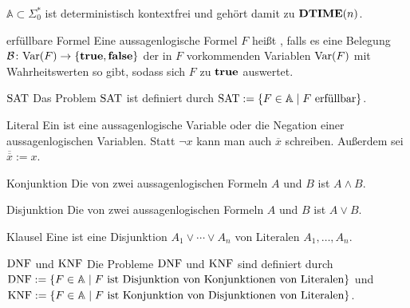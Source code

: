 \begin{Bem}
    $\mathbb{A} \subset \Sigma_0^\ast$ ist deterministisch kontextfrei
    und gehört damit zu $\mathbf{DTIME}(n)$.
\end{Bem}

\begin{Def}{erfüllbare Formel}
    Eine aussagenlogische Formel $F$ heißt ,
    falls es eine Belegung $\mathcal{B}\colon \text{Var}(F) \rightarrow \{\mathbf{true}, \mathbf{false}\}$
    der in $F$ vorkommenden Variablen $\text{Var}(F)$ mit Wahrheitswerten so gibt,
    sodass sich $F$ zu $\mathbf{true}$ auswertet.
\end{Def}

\begin{Def}{$\text{SAT}$}
    Das Problem $\text{SAT}$ ist definiert durch
    $\text{SAT} := \{F \in \mathbb{A} \;|\; F \text{ erfüllbar}\}$.
\end{Def}

\linie

\begin{Def}{Literal}
    Ein  ist eine aussagenlogische Variable
    oder die Negation einer aussagenlogischen Variablen.
    Statt $\lnot x$ kann man auch $\overline{x}$ schreiben.
    Außerdem sei $\overline{\overline{x}} := x$.
\end{Def}

\begin{Def}{Konjunktion}
    Die  von zwei aussagenlogischen Formeln $A$ und $B$ ist
    $A \land B$.
\end{Def}

\begin{Def}{Disjunktion}
    Die  von zwei aussagenlogischen Formeln $A$ und $B$ ist
    $A \lor B$.
\end{Def}

\begin{Def}{Klausel}
    Eine  ist eine Disjunktion $A_1 \lor \dotsb \lor A_n$
    von Literalen $A_1, \dotsc, A_n$.
\end{Def}

\begin{Def}{$\text{DNF}$ und $\text{KNF}$}
    Die Probleme $\text{DNF}$ und $\text{KNF}$ sind definiert durch\\
    $\text{DNF} := \{F \in \mathbb{A} \;|\;
    F \text{ ist Disjunktion von Konjunktionen von Literalen}\}$ und\\
    $\text{KNF} := \{F \in \mathbb{A} \;|\;
    F \text{ ist Konjunktion von Disjunktionen von Literalen}\}$.
\end{Def}

